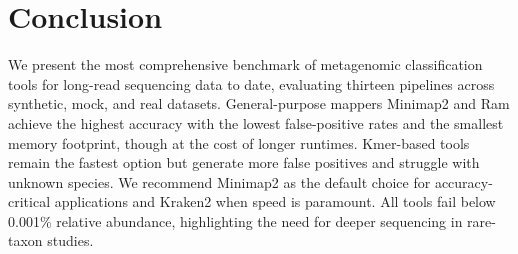 \documentclass[12pt]{article}
\begin{document}
\section{Conclusion}

We present the most comprehensive benchmark of metagenomic classification tools for long-read sequencing data to date, evaluating thirteen pipelines across synthetic, mock, and real datasets. General-purpose mappers Minimap2 and Ram achieve the highest accuracy with the lowest false-positive rates and the smallest memory footprint, though at the cost of longer runtimes. Kmer-based tools remain the fastest option but generate more false positives and struggle with unknown species. We recommend Minimap2 as the default choice for accuracy-critical applications and Kraken2 when speed is paramount. All tools fail below 0.001\% relative abundance, highlighting the need for deeper sequencing in rare-taxon studies.



\end{document}
